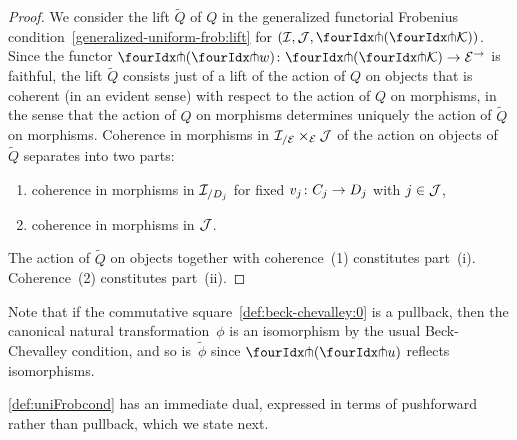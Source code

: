 \documentclass[reqno,10pt,a4paper,oneside,draft]{amsart}
\begin{document}
{{\begin{proof}
We consider the lift $\widetilde{Q}$ of $Q$ in the generalized functorial Frobenius condition~\eqref{generalized-uniform-frob:lift} for $(\cal{I}, \cal{J}, \liftl{(\liftr{\cal{K}})})$.
Since the functor $\liftl{(\liftr{w})} \co \liftl{(\liftr{\cal{K}})} \to \cal{E}^\to$ is faithful, the lift $\widetilde{Q}$ consists just of a lift of the action of $Q$ on objects that is coherent (in an evident sense) with respect to the action of $Q$ on morphisms, in the sense that the action of $Q$ on morphisms determines uniquely the action of $\widetilde{Q}$ on morphisms.
Coherence in morphisms in $\cal{I}_{/\cal{E}} \times_{\cal{E}} \cal{J}$ of the action on objects of $\widetilde{Q}$ separates into two parts:
\begin{enumerate}[(1)]
\item coherence in morphisms in $\cal{I}_{/D_j}$ for fixed $v_j \co C_j \to D_j$ with $j \in \cal{J}$,
\item coherence in morphisms in $\cal{J}$.
\end{enumerate}
The action of $\widetilde{Q}$ on objects together with coherence~(1) constitutes part~(i).
Coherence~(2) constitutes part~(ii).
\end{proof}

Note that if the commutative square~\eqref{def:beck-chevalley:0} is a pullback, then the canonical natural transformation~$\phi$ is an isomorphism by the usual Beck-Chevalley condition, and so is~$\tilde{\phi}$ since $\liftl{(\liftr{u})}$ reflects isomorphisms.

\cref{def:uniFrobcond} has an immediate dual, expressed in terms of pushforward rather than pullback, which we state next.

}}
\end{document}
